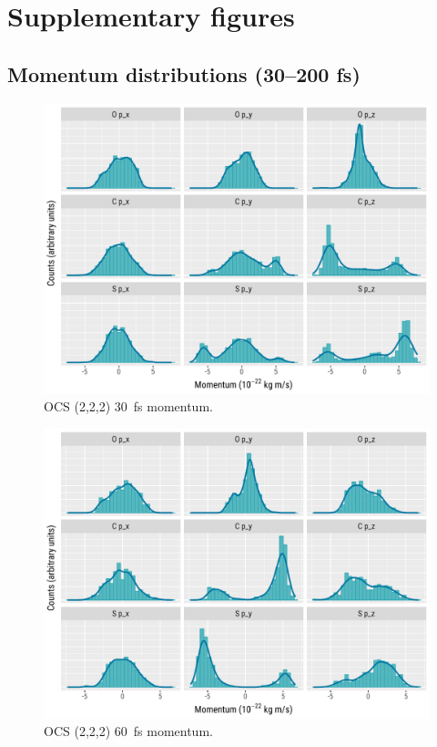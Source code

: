 \chapter{Supplementary figures}\label{appx:supplementaryFigures}

\section{Momentum distributions (30--200 fs)}

\begin{figure}
  \centering
  \includegraphics[width=\textwidth]{Plots/OCS22230fsMomentum}
  \caption[OCS (2,2,2) \SI{30}{\fs} momentum.]
  {OCS (2,2,2) \SI{30}{\fs} momentum.}
  \label{fig:OCS22230fsMomentum}
\end{figure}

\begin{figure}
  \centering
  \includegraphics[width=\textwidth]{Plots/OCS22260fsMomentum}
  \caption[OCS (2,2,2) \SI{60}{\fs} momentum.]
  {OCS (2,2,2) \SI{60}{\fs} momentum.}
  \label{fig:OCS22260fsMomentum}
\end{figure}

